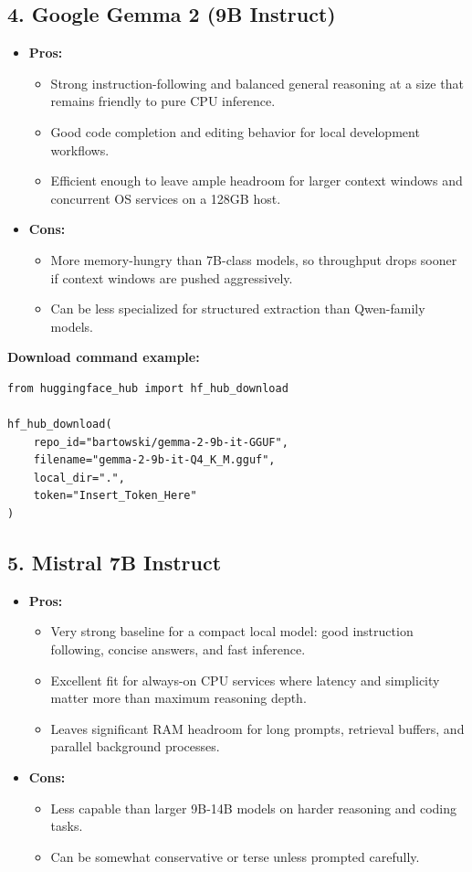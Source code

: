 \documentclass{article}
\begin{document}
\subsection*{4. Google Gemma 2 (9B Instruct)}
\begin{itemize}
    \item \textbf{Pros:}
    \begin{itemize}
        \item Strong instruction-following and balanced general reasoning at a size that remains friendly to pure CPU inference.
        \item Good code completion and editing behavior for local development workflows.
        \item Efficient enough to leave ample headroom for larger context windows and concurrent OS services on a 128GB host.
    \end{itemize}
    \item \textbf{Cons:}
    \begin{itemize}
        \item More memory-hungry than 7B-class models, so throughput drops sooner if context windows are pushed aggressively.
        \item Can be less specialized for structured extraction than Qwen-family models.
    \end{itemize}
\end{itemize}

\noindent\textbf{Download command example:}
\begin{verbatim}
from huggingface_hub import hf_hub_download

hf_hub_download(
    repo_id="bartowski/gemma-2-9b-it-GGUF",
    filename="gemma-2-9b-it-Q4_K_M.gguf",
    local_dir=".",
    token="Insert_Token_Here"
)
\end{verbatim}

\subsection*{5. Mistral 7B Instruct}
\begin{itemize}
    \item \textbf{Pros:}
    \begin{itemize}
        \item Very strong baseline for a compact local model: good instruction following, concise answers, and fast inference.
        \item Excellent fit for always-on CPU services where latency and simplicity matter more than maximum reasoning depth.
        \item Leaves significant RAM headroom for long prompts, retrieval buffers, and parallel background processes.
    \end{itemize}
    \item \textbf{Cons:}
    \begin{itemize}
        \item Less capable than larger 9B-14B models on harder reasoning and coding tasks.
        \item Can be somewhat conservative or terse unless prompted carefully.
    \end{itemize}
\end{itemize}
\end{document}
